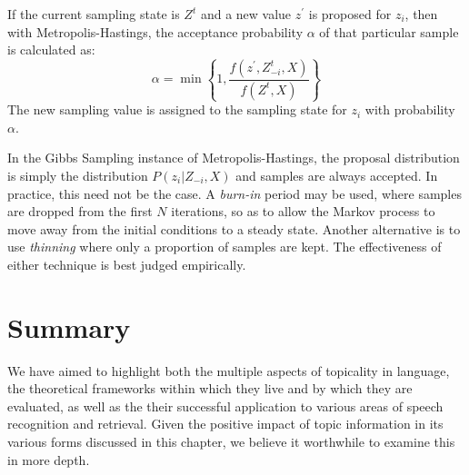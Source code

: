 If the current sampling state is $Z^t$ and a new value $z^\prime$ is proposed for $z_i$, then with Metropolis-Hastings, the acceptance probability $\alpha$ of that particular sample is calculated as:
\begin{equation}
\alpha=\min\left\{1,\frac{f(z^\prime,Z^t_{-i},X)}{f(Z^t,X)}\right\}
\end{equation}
The new sampling value is assigned to the sampling state for $z_i$ with probability $\alpha$.

In the Gibbs Sampling instance of Metropolis-Hastings, the proposal distribution is simply the distribution $P(z_i|Z_{-i},X)$ and samples are always accepted.  In practice, this need not be the case.  A \textit{burn-in} period may be used, where samples are dropped from the first $N$ iterations, so as to allow the Markov process to move away from the initial conditions to a steady state.   Another alternative is to use \textit{thinning} where only a proportion of samples are kept.  The effectiveness of either technique is best judged empirically.   %

\nocite{steyvers2007}
\nocite{yao2009efficient}

\section{Summary}
We have aimed to highlight both the multiple aspects of topicality in language, the theoretical frameworks within which they live and by which they are evaluated, as well as the their successful application to various areas of speech recognition and retrieval.  Given the positive impact of topic information in its various forms discussed in this chapter, we believe it worthwhile to examine this in more depth.


